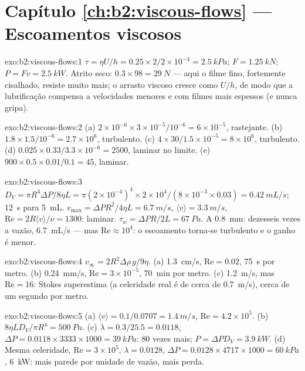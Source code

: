 \section*{Capítulo \ref{ch:b2:viscous-flows} --- Escoamentos viscosos}

\begin{solution}{exo:b2:viscous-flows:1}
$\tau = \eta U/h = 0.25 \times 2/2 \times 10^{-4} = \qty{2.5}{kPa}$; $F = \qty{1.25}{kN}$;
$P = Fv = \qty{2.5}{kW}$. Atrito seco: $0.3 \times 98 = \qty{29}{N}$ --- aqui o
filme fino, fortemente cisalhado, resiste muito mais; o arrasto viscoso cresce como
$U/h$, de modo que a lubrificação compensa a velocidades menores e com filmes mais espessos (e
nunca gripa).
\end{solution}

\begin{solution}{exo:b2:viscous-flows:2}
(a) $2 \times 10^{-6} \times 3 \times 10^{-5}/10^{-6} = 6 \times 10^{-5}$, rastejante. (b)
$1.8 \times 1.5/10^{-6} = 2.7 \times 10^6$, turbulento. (c) $4 \times 30/1.5 \times 10^{-5}
= 8 \times 10^6$, turbulento. (d) $0.025 \times 0.33/3.3 \times 10^{-6} = 2500$,
laminar no limite. (e) $900 \times 0.5 \times 0.01/0.1 = 45$, laminar.
\end{solution}

\begin{solution}{exo:b2:viscous-flows:3}
$D_V = \pi R^4\Delta P/8\eta L = \pi(2 \times 10^{-4})^4 \times 2 \times 10^4/(8 \times 10^{-3}
\times 0.03) = \qty{0.42}{mL/s}$; \qty{12}{s} para \qty{5}{mL}. $v_{\max} = \Delta PR^2/
4\eta L = \qty{6.7}{m/s}$, $\langle v\rangle = \qty{3.3}{m/s}$, $\mathrm{Re} = 2R\langle v
\rangle/\nu = 1300$: laminar. $\tau_w = \Delta PR/2L = \qty{67}{Pa}$. A \qty{0.8}{mm}:
dezesseis vezes a vazão, \qty{6.7}{mL/s} --- mas $\mathrm{Re} \approx 10^4$: o escoamento
torna-se turbulento e o ganho é menor.
\end{solution}

\begin{solution}{exo:b2:viscous-flows:4}
$v_\infty = 2R^2\Delta\rho\,g/9\eta$. (a) \qty{1.3}{cm/s}, $\mathrm{Re} = 0.02$, \qty{75}{s}
por metro. (b) \qty{0.24}{mm/s}, $\mathrm{Re} = 3 \times 10^{-5}$, \qty{70}{min} por
metro. (c) \qty{1.2}{m/s}, mas $\mathrm{Re} = 16$: Stokes superestima (a celeridade
real é de cerca de \qty{0.7}{m/s}), cerca de um segundo por metro.
\end{solution}

\begin{solution}{exo:b2:viscous-flows:5}
(a) $\langle v\rangle = 0.1/0.0707 = \qty{1.4}{m/s}$, $\mathrm{Re} = 4.2 \times 10^5$. (b)
$8\eta LD_V/\pi R^4 = \qty{500}{Pa}$. (c) $\lambda = 0.3/25.5 = 0.0118$, $\Delta P = 0.0118
\times 3333 \times 1000 = \qty{39}{kPa}$: $80$ vezes mais; $P = \Delta PD_V = \qty{3.9}{kW}$.
(d) Mesma celeridade, $\mathrm{Re} = 3 \times 10^5$, $\lambda = 0.0128$, $\Delta P = 0.0128 \times 4717
\times 1000 = \qty{60}{kPa}$, \qty{6}{kW}: mais parede por unidade de vazão, mais perda.
\end{solution}

